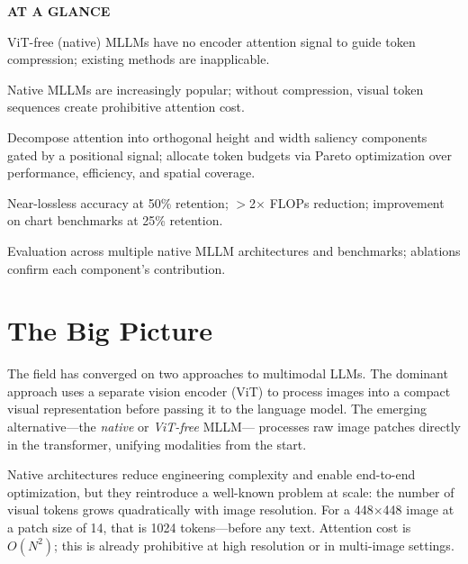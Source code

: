\documentclass[10pt,twocolumn]{article}
\begin{document}
\begin{mdframed}[backgroundcolor=boxgray,linecolor=rulered,linewidth=1pt,
    innerleftmargin=6pt,innerrightmargin=6pt,
    innertopmargin=6pt,innerbottommargin=6pt]
\textbf{\small AT A GLANCE}\par\vspace{4pt}
\begin{description}[leftmargin=0pt,labelsep=4pt,itemsep=2pt,parsep=0pt,
    font=\small\bfseries]
  \item[Problem:] ViT-free (native) MLLMs have no encoder attention signal
    to guide token compression; existing methods are inapplicable.
  \item[Why it matters:] Native MLLMs are increasingly popular; without
    compression, visual token sequences create prohibitive attention cost.
  \item[Method:] Decompose attention into orthogonal height and width
    saliency components gated by a positional signal; allocate token
    budgets via Pareto optimization over performance, efficiency, and
    spatial coverage.
  \item[Result:] Near-lossless accuracy at 50\% retention; $>$2$\times$
    FLOPs reduction; improvement on chart benchmarks at 25\% retention.
  \item[Evidence:] Evaluation across multiple native MLLM architectures
    and benchmarks; ablations confirm each component's contribution.
\end{description}
\end{mdframed}

\section{The Big Picture}

The field has converged on two approaches to multimodal LLMs. The dominant
approach uses a separate vision encoder (ViT) to process images into a
compact visual representation before passing it to the language model.
The emerging alternative---the \textit{native} or \textit{ViT-free} MLLM---
processes raw image patches directly in the transformer, unifying modalities
from the start.

Native architectures reduce engineering complexity and enable end-to-end
optimization, but they reintroduce a well-known problem at scale: the number
of visual tokens grows quadratically with image resolution. For a 448$\times$448
image at a patch size of 14, that is 1024 tokens---before any text. Attention
cost is $O(N^2)$; this is already prohibitive at high resolution or in
multi-image settings.
\end{document}
